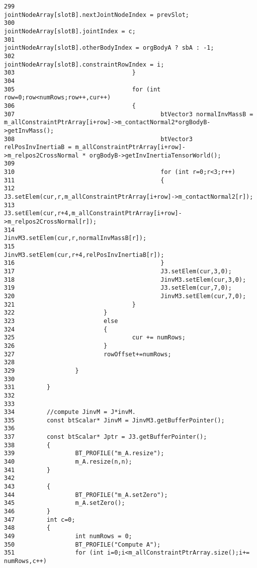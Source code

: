 \begin{Code}
\begin{verbatim}
299                                         jointNodeArray[slotB].nextJointNodeIndex = prevSlot;
300                                         jointNodeArray[slotB].jointIndex = c;
301                                         jointNodeArray[slotB].otherBodyIndex = orgBodyA ? sbA : -1;
302                                         jointNodeArray[slotB].constraintRowIndex = i;
303                                 }
304 
305                                 for (int row=0;row<numRows;row++,cur++)
306                                 {
307                                         btVector3 normalInvMassB = m_allConstraintPtrArray[i+row]->m_contactNormal2*orgBodyB->getInvMass();
308                                         btVector3 relPosInvInertiaB = m_allConstraintPtrArray[i+row]->m_relpos2CrossNormal * orgBodyB->getInvInertiaTensorWorld();
309 
310                                         for (int r=0;r<3;r++)
311                                         {
312                                                 J3.setElem(cur,r,m_allConstraintPtrArray[i+row]->m_contactNormal2[r]);
313                                                 J3.setElem(cur,r+4,m_allConstraintPtrArray[i+row]->m_relpos2CrossNormal[r]);
314                                                 JinvM3.setElem(cur,r,normalInvMassB[r]);
315                                                 JinvM3.setElem(cur,r+4,relPosInvInertiaB[r]);
316                                         }
317                                         J3.setElem(cur,3,0);
318                                         JinvM3.setElem(cur,3,0);
319                                         J3.setElem(cur,7,0);
320                                         JinvM3.setElem(cur,7,0);
321                                 }
322                         }
323                         else
324                         {
325                                 cur += numRows;
326                         }
327                         rowOffset+=numRows;
328 
329                 }
330                 
331         }
332 
333 
334         //compute JinvM = J*invM.
335         const btScalar* JinvM = JinvM3.getBufferPointer();
336 
337         const btScalar* Jptr = J3.getBufferPointer();
338         {
339                 BT_PROFILE("m_A.resize");
340                 m_A.resize(n,n);
341         }
342         
343         {
344                 BT_PROFILE("m_A.setZero");
345                 m_A.setZero();
346         }
347         int c=0;
348         {
349                 int numRows = 0;
350                 BT_PROFILE("Compute A");
351                 for (int i=0;i<m_allConstraintPtrArray.size();i+= numRows,c++)

\end{verbatim}
\end{Code}
